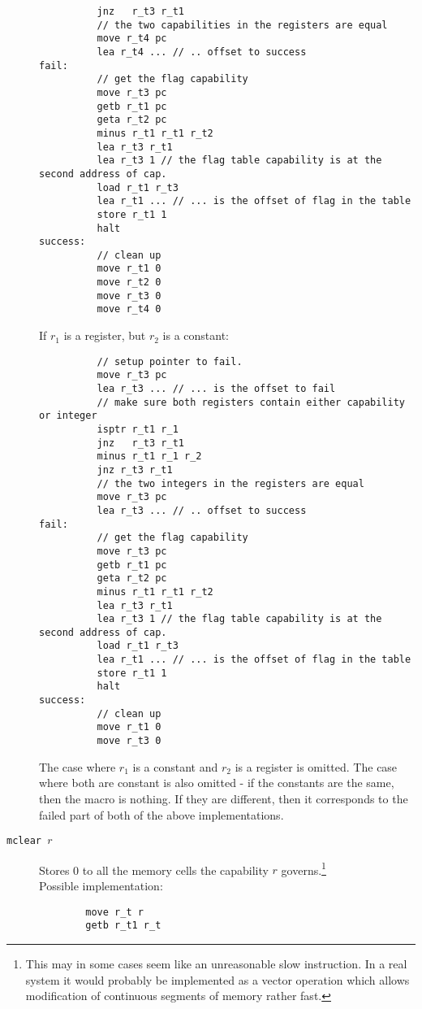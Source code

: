 \documentclass[a4paper]{article}
\begin{document}
\begin{description}
\begin{lstlisting}
          jnz   r_t3 r_t1          
          // the two capabilities in the registers are equal
          move r_t4 pc
          lea r_t4 ... // .. offset to success
fail:
          // get the flag capability
          move r_t3 pc
          getb r_t1 pc
          geta r_t2 pc
          minus r_t1 r_t1 r_t2
          lea r_t3 r_t1
          lea r_t3 1 // the flag table capability is at the second address of cap.
          load r_t1 r_t3
          lea r_t1 ... // ... is the offset of flag in the table
          store r_t1 1
          halt
success:                   
          // clean up
          move r_t1 0
          move r_t2 0
          move r_t3 0
          move r_t4 0
\end{lstlisting}
If $r_1$ is a register, but $r_2$ is a constant:
\begin{lstlisting}
          // setup pointer to fail.
          move r_t3 pc
          lea r_t3 ... // ... is the offset to fail
          // make sure both registers contain either capability or integer
          isptr r_t1 r_1
          jnz   r_t3 r_t1
          minus r_t1 r_1 r_2
          jnz r_t3 r_t1
          // the two integers in the registers are equal
          move r_t3 pc
          lea r_t3 ... // .. offset to success
fail:
          // get the flag capability
          move r_t3 pc
          getb r_t1 pc
          geta r_t2 pc
          minus r_t1 r_t1 r_t2
          lea r_t3 r_t1
          lea r_t3 1 // the flag table capability is at the second address of cap.
          load r_t1 r_t3
          lea r_t1 ... // ... is the offset of flag in the table
          store r_t1 1
          halt
success:                   
          // clean up
          move r_t1 0
          move r_t3 0
\end{lstlisting}
The case where $r_1$ is a constant and $r_2$ is a register is omitted. The case where both are constant is also omitted - if the constants are the same, then the macro is nothing. If they are different, then it corresponds to the failed part of both of the above implementations.
              \item[\texttt{mclear $r$}] Stores 0 to all the memory cells the capability $r$ governs.\footnote{This may in some cases seem like an unreasonable slow instruction. In a real system it would probably be implemented as a vector operation which allows modification of continuous segments of memory rather fast.} \\
Possible implementation:
\begin{lstlisting}
        move r_t r
        getb r_t1 r_t

\end{lstlisting}
\end{description}
\end{document}
